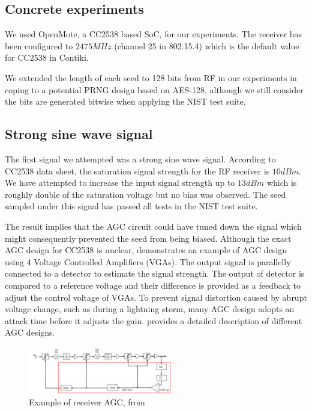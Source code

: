 \subsection{Concrete experiments}
We used OpenMote\cite{OpenMote}, a CC2538 based SoC, for our experiments. The receiver has been configured to $2475MHz$ (channel 25 in 802.15.4) which is the default value for CC2538 in Contiki. 

We extended the length of each seed to 128 bits from RF in our experiments in coping to a potential PRNG design based on AES-128, although we still consider the bits are generated bitwise when applying the NIST test suite.

\subsection{Strong sine wave signal} \label{StrongSine}
The first signal we attempted was a strong sine wave signal. According to CC2538 data sheet\cite{CC2538Datasheet}, the saturation signal strength for the RF receiver is $10 dBm$. We have attempted to increase the input signal strength up to $13dBm$ which is roughly double of the saturation voltage but no bias was observed. The seed sampled under this signal has passed all tests in the NIST test suite.

The result implies that the AGC circuit could have tuned down the signal which might consequently prevented the seed from being biased. Although the exact AGC design for CC2538 is unclear,  demonstrates an example of AGC design using 4 Voltage Controlled Amplifiers (VGAs). The output signal is parallelly connected to a detector to estimate the signal strength. The output of detector is compared to a reference voltage and their difference is provided as a feedback to adjust the control voltage of VGAs. To prevent signal distortion caused by abrupt voltage change, such as during a lightning storm, many AGC design adopts an attack time before it adjusts the gain. \cite{AGC} provides a detailed description of different AGC designs. 

\begin{figure}[!t]
\centering
\includegraphics[width=2.5in]{fig/AGC.png}
\caption{Example of receiver AGC, from \cite{AGC_QSL}}
\label{AGC_QSL}
\end{figure}



